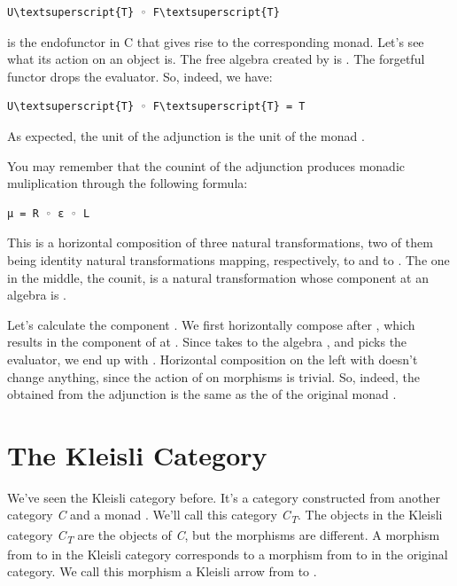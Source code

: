 \begin{Verbatim}[commandchars=\\\{\}]
U\textsuperscript{T} ◦ F\textsuperscript{T}
\end{Verbatim}
is the endofunctor in C that gives rise to the corresponding monad.
Let's see what its action on an object  is. The free algebra
created by  is . The forgetful functor
 drops the evaluator. So, indeed, we have:

\begin{Verbatim}[commandchars=\\\{\}]
U\textsuperscript{T} ◦ F\textsuperscript{T} = T
\end{Verbatim}
As expected, the unit of the adjunction is the unit of the monad
.

You may remember that the counint of the adjunction produces monadic
muliplication through the following formula:

\begin{verbatim}
μ = R ◦ ε ◦ L
\end{verbatim}
This is a horizontal composition of three natural transformations, two
of them being identity natural transformations mapping, respectively,
 to  and  to . The one in the
middle, the counit, is a natural transformation whose component at an
algebra  is .

Let's calculate the component . We first horizontally compose
 after , which results in the component of
 at . Since  takes  to the
algebra , and  picks the evaluator, we end
up with . Horizontal composition on the left with 
doesn't change anything, since the action of  on morphisms is
trivial. So, indeed, the  obtained from the adjunction is the
same as the  of the original monad .

\section{The Kleisli Category}\label{the-kleisli-category}

We've seen the Kleisli category before. It's a category constructed from
another category \emph{C} and a monad . We'll call this
category \emph{C\textsubscript{T}}. The objects in the Kleisli category
\emph{C\textsubscript{T}} are the objects of \emph{C}, but the morphisms
are different. A morphism  from  to  in
the Kleisli category corresponds to a morphism  from
 to  in the original category. We call this
morphism a Kleisli arrow from  to .

